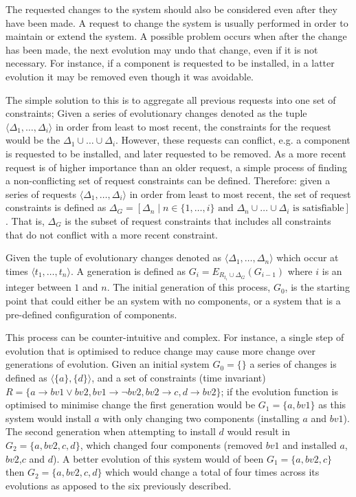 The requested changes to the system should also be considered even after they have been made.
A request to change the system is usually performed in order to maintain or extend the system.
A possible problem occurs when after the change has been made, the next evolution may undo that change, even if it is not necessary.
For instance, if a component is requested to be installed, in a latter evolution it may be removed even though it was avoidable.

The simple solution to this is to aggregate all previous requests into one set of constraints;
Given a series of evolutionary changes denoted as the tuple $\langle \Delta_1, \ldots, \Delta_i \rangle$ in order from least to most recent,
the constraints for the request would be the $\Delta_1 \cup \ldots \cup \Delta_i$.
However, these requests can conflict, e.g. a component is requested to be installed, and later requested to be removed.
As a more recent request is of higher importance than an older request, a simple process of finding a non-conflicting set of request constraints can be defined.
Therefore: given a series of requests $\langle \Delta_1, \ldots, \Delta_i \rangle$ in order from least to most recent,
the set of request constraints is defined as $\Delta_G = [\Delta_n \mid n \in \{1, \ldots , i\} \mbox{ and } \Delta_n \cup \ldots \cup \Delta_i \mbox{ is satisfiable}]$.
That is, $\Delta_G$ is the subset of request constraints that includes all constraints that do not conflict with a more recent constraint.

Given the tuple of evolutionary changes denoted as $\langle \Delta_1, \ldots, \Delta_n \rangle$
which occur at times  $\langle t_1, \ldots, t_n \rangle$.
A generation is defined as $G_i = E_{R_{t_i} \cup \Delta_G}(G_{i-1})$ where $i$ is an integer between $1$ and $n$.
The initial generation of this process, $G_0$, is the starting point that could either be an system with no components, or a system that is a pre-defined configuration of components.

This process can be counter-intuitive and complex.
For instance, a single step of evolution that is optimised to reduce change may cause more change over generations of evolution.
Given an initial system $G_0 = \{\}$ a series of changes is defined as $\langle \{a\}, \{d\}\rangle$, 
and a set of constraints (time invariant) $R = \{a \rightarrow bv1 \vee bv2, bv1 \rightarrow \neg bv2, bv2 \rightarrow c, d \rightarrow bv2\}$;
if the evolution function is optimised to minimise change the first generation would be $G_1 = \{a,bv1\}$ as this system would install $a$ with only changing two components (installing $a$ and $bv1$).
The second generation when attempting to install $d$ would result in $G_2 = \{a,bv2,c,d\}$, which changed four components (removed $bv1$ and installed $a$,$bv2$,$c$ and $d$).
A better evolution of this system would of been $G_1 = \{a,bv2,c\}$ then $G_2 = \{a,bv2,c,d\}$ which would change a total of four times across its evolutions as apposed to the six previously described.

